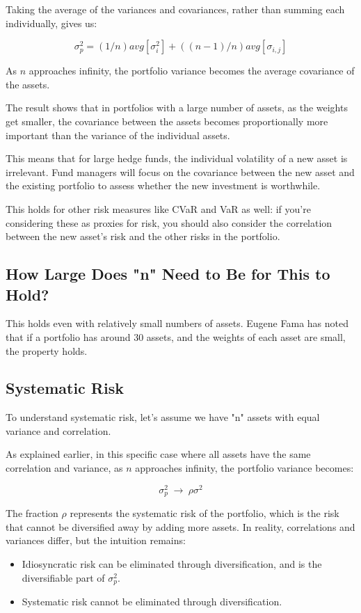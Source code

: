 \documentclass{article}
\begin{document}
Taking the average of the variances and covariances, rather than summing each individually, gives us:

$$
{\sigma}_{p}^{2}=(1/n)avg[{{\sigma}_{i}^{2}}]+((n-1)/n)avg[{\sigma}_{i, j}]
$$

As $n$ approaches infinity, the portfolio variance becomes the average covariance of the assets.

The result shows that in portfolios with a large number of assets, as the weights get smaller, the covariance between the assets becomes proportionally more important than the variance of the individual assets.

This means that for large hedge funds, the individual volatility of a new asset is irrelevant. Fund managers will focus on the covariance between the new asset and the existing portfolio to assess whether the new investment is worthwhile.

This holds for other risk measures like CVaR and VaR as well: if you're considering these as proxies for risk, you should also consider the correlation between the new asset's risk and the other risks in the portfolio.

\subsection{How Large Does "n" Need to Be for This to Hold?}
This holds even with relatively small numbers of assets. Eugene Fama has noted that if a portfolio has around 30 assets, and the weights of each asset are small, the property holds.

\subsection{Systematic Risk}
To understand systematic risk, let's assume we have "n" assets with equal variance and correlation.

As explained earlier, in this specific case where all assets have the same correlation and variance, as $n$ approaches infinity, the portfolio variance becomes:

$$
{\sigma}_{p}^2\hspace{3pt}{\rightarrow}\hspace{3pt}{\rho}{\sigma}^{2}
$$

The fraction ${\rho}$ represents the systematic risk of the portfolio, which is the risk that cannot be diversified away by adding more assets. In reality, correlations and variances differ, but the intuition remains:
\begin{itemize}
    \item Idiosyncratic risk can be eliminated through diversification, and is the diversifiable part of ${\sigma}_{p}^2$.
    \item Systematic risk cannot be eliminated through diversification.
\end{itemize}
\end{document}
